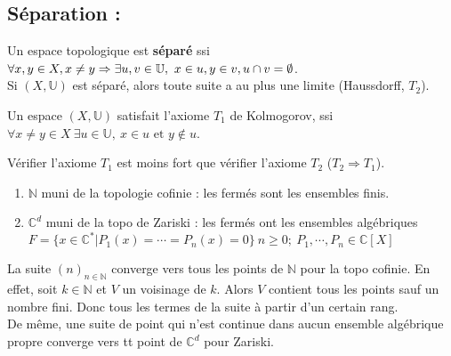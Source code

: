 \subsection{ Séparation :}
\begin{definition}
    Un espace topologique est \textbf{séparé} ssi $\forall x,y\in X,\\ x\neq y\Rightarrow \exists u,v\in \mathbb{U},\ x\in u, y\in v, u\cap v=\emptyset $.\\
Si $(X,\mathbb{U})$ est séparé, alors toute suite a au plus une limite (Haussdorff, $T_2$).\\

\end{definition}
\begin{definition}
        Un espace $(X,\mathbb{U})$ satisfait l'axiome $T_1$ de Kolmogorov, ssi $\forall x\neq y\in X\ \exists u\in \mathbb{U},\ x\in u \text{ et } y \not \in u$.\\

\end{definition}
\begin{ex}

Vérifier l'axiome $T_1$ est moins fort que vérifier l'axiome $T_2$ ($T_2 \Rightarrow T_1$). 
 
\begin{enumerate}

   \item $\mathbb{N} $ muni de la topologie cofinie : les fermés sont les ensembles finis.
\item $\mathbb{C}^d$ muni de la topo de Zariski : les fermés ont les ensembles algébriques $F=\{x\in \mathbb{C}^*|P_1(x)=\cdots = P_n(x)=0\}\ n\ge 0;\ P_1,\cdots,P_n\in \mathbb{C}[X]$
\end{enumerate}
\end{ex}
\begin{ex}

La suite $(n)_{n\in \mathbb{N} }$ converge vers tous les points de $\mathbb{N} $ pour la topo cofinie. En effet, soit $k\in \mathbb{N} $ et $V$ un voisinage de $k$. Alors $V$ contient tous les points sauf un nombre fini. Donc tous les termes de la suite à partir d'un certain rang.\\
De même, une suite de point qui n'est continue dans aucun ensemble algébrique propre converge vers tt point de $\mathbb{C}^d$ pour Zariski.
\end{ex}

